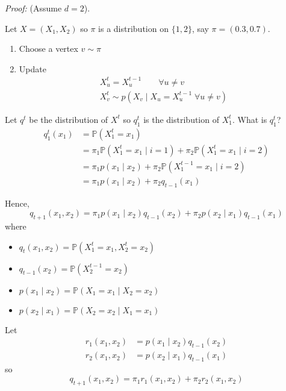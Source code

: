 \documentclass[12pt]{report}
\renewcommand{\P}{\mathbb{P}}
\newenvironment*{tbox}[2][gray]{
    \begin{tcolorbox}[
        parbox=false,
        colback=#1!5!white,
        colframe=#1!75!black,
        breakable,
        title={#2}
    ]}
    {\end{tcolorbox}}
\begin{document}
\begin{tbox}{\textbf{Claim:} Let $X^0, X^1, \dots$ be a Gibbs Sampler. Let $q_t$ be the distribution of $X^t$. Then $D(q_t \parallel p) \leq D(q_{t-1} \parallel p)$ for all $t$.}
	\emph{Proof:} (Assume $d= 2$).

	Let $X = (X_1, X_2)$ so $\pi$ is a distribution on $\{1, 2\}$, say $\pi = (0.3, 0.7)$.

	\begin{enumerate}
		\item Choose a vertex $v \sim \pi$
		\item Update
		      \begin{align*}
			      X_u^t = X_u^{t-1} \qquad \forall u \neq v \\
			      X_v^t \sim p(X_v \; | \; X_u = X_u^{t-1} \; \forall u \neq v)
		      \end{align*}
	\end{enumerate}

	Let $q^t$ be the distribution of $X^t$ so $q_1^t$ is the distribution of $X_1^t$. What is $q_1^t$?
	\begin{align*}
		q_1^t(x_1) & = \P(X_1^t = x_1)                                                          \\
		           & = \pi_1 \P(X_1^t = x_1\; | \; i = 1) + \pi_2 \P(X_1^t = x_1 \; | \; i = 2) \\
		           & = \pi_1 p(x_1 \; | \; x_2) + \pi_2 \P(X_1^{t-1} = x_1 \; | \; i =2)        \\
		           & = \pi_1 p(x_1 \; | \; x_2) + \pi_2 q_{t-1}(x_1)
	\end{align*}

	Hence,
	\[q_{t+1}(x_1, x_2) = \pi_1 p(x_1 \; | \; x_2) q_{t-1}(x_2) + \pi_2 p(x_2 \; | \; x_1) q_{t-1}(x_1)\]
	where
	\begin{itemize}
		\item $q_t(x_1, x_2) = \P(X_1^t = x_1, X_2^t = x_2)$
		\item $q_{t-1}(x_2) = \P(X_2^{t-1} = x_2)$
		\item $p(x_1 \; | \; x_2) = \P(X_1 = x_1 \; | \; X_2 = x_2)$
		\item $p(x_2 \; | \; x_1) = \P(X_2 = x_2 \; | \; X_1 = x_1)$
	\end{itemize}

	Let
	\begin{align*}
		r_1(x_1, x_2) & = p(x_1 \; | \; x_2) q_{t-1}(x_2) \\
		r_2(x_1, x_2) & = p(x_2 \; | \; x_1) q_{t-1}(x_1)
	\end{align*}
	so
	\[q_{t+1}(x_1, x_2) = \pi_1 r_1(x_1, x_2) + \pi_2 r_2(x_1, x_2)\]


\end{tbox}
\end{document}

